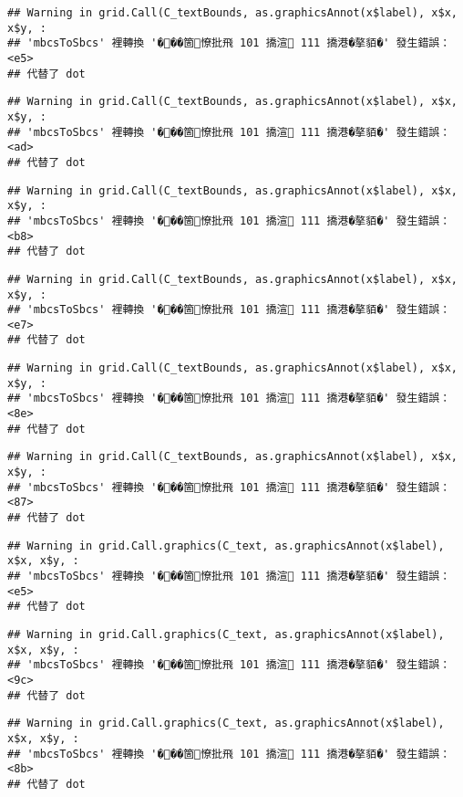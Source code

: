\documentclass[
]{article}
\begin{document}
\begin{verbatim}
## Warning in grid.Call(C_textBounds, as.graphicsAnnot(x$label), x$x, x$y, :
## 'mbcsToSbcs' 裡轉換 '���箇憭批飛 101 撟渲 111 撟港�摮貊�' 發生錯誤：<e5>
## 代替了 dot
\end{verbatim}

\begin{verbatim}
## Warning in grid.Call(C_textBounds, as.graphicsAnnot(x$label), x$x, x$y, :
## 'mbcsToSbcs' 裡轉換 '���箇憭批飛 101 撟渲 111 撟港�摮貊�' 發生錯誤：<ad>
## 代替了 dot
\end{verbatim}

\begin{verbatim}
## Warning in grid.Call(C_textBounds, as.graphicsAnnot(x$label), x$x, x$y, :
## 'mbcsToSbcs' 裡轉換 '���箇憭批飛 101 撟渲 111 撟港�摮貊�' 發生錯誤：<b8>
## 代替了 dot
\end{verbatim}

\begin{verbatim}
## Warning in grid.Call(C_textBounds, as.graphicsAnnot(x$label), x$x, x$y, :
## 'mbcsToSbcs' 裡轉換 '���箇憭批飛 101 撟渲 111 撟港�摮貊�' 發生錯誤：<e7>
## 代替了 dot
\end{verbatim}

\begin{verbatim}
## Warning in grid.Call(C_textBounds, as.graphicsAnnot(x$label), x$x, x$y, :
## 'mbcsToSbcs' 裡轉換 '���箇憭批飛 101 撟渲 111 撟港�摮貊�' 發生錯誤：<8e>
## 代替了 dot
\end{verbatim}

\begin{verbatim}
## Warning in grid.Call(C_textBounds, as.graphicsAnnot(x$label), x$x, x$y, :
## 'mbcsToSbcs' 裡轉換 '���箇憭批飛 101 撟渲 111 撟港�摮貊�' 發生錯誤：<87>
## 代替了 dot
\end{verbatim}

\begin{verbatim}
## Warning in grid.Call.graphics(C_text, as.graphicsAnnot(x$label), x$x, x$y, :
## 'mbcsToSbcs' 裡轉換 '���箇憭批飛 101 撟渲 111 撟港�摮貊�' 發生錯誤：<e5>
## 代替了 dot
\end{verbatim}

\begin{verbatim}
## Warning in grid.Call.graphics(C_text, as.graphicsAnnot(x$label), x$x, x$y, :
## 'mbcsToSbcs' 裡轉換 '���箇憭批飛 101 撟渲 111 撟港�摮貊�' 發生錯誤：<9c>
## 代替了 dot
\end{verbatim}

\begin{verbatim}
## Warning in grid.Call.graphics(C_text, as.graphicsAnnot(x$label), x$x, x$y, :
## 'mbcsToSbcs' 裡轉換 '���箇憭批飛 101 撟渲 111 撟港�摮貊�' 發生錯誤：<8b>
## 代替了 dot
\end{verbatim}
\end{document}
